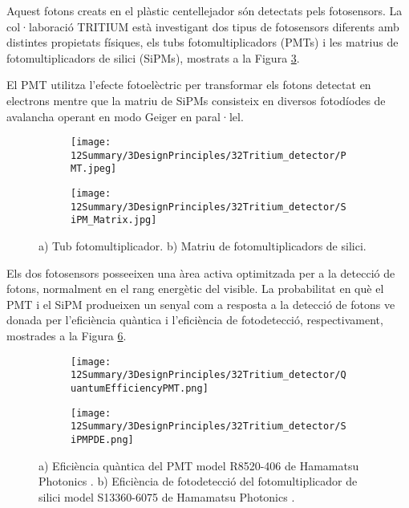 Aquest fotons creats en el plàstic centellejador són detectats pels fotosensors. La col·laboració TRITIUM està investigant dos tipus de fotosensors diferents amb distintes propietats físiques, els tubs fotomultiplicadors (PMTs) i les matrius de fotomultiplicadors de silici (SiPMs), mostrats a la Figura \ref{fig:Fotosensors}.

El PMT utilitza l'efecte fotoelèctric per transformar els fotons detectat en electrons mentre que la matriu de SiPMs consisteix en diversos fotodíodes de avalancha operant en modo Geiger en paral·lel.

\begin{figure}[htpb]
\centering
    \begin{subfigure}[b]{0.4\textwidth}
    \centering
    \texttt{[image: 12Summary/3DesignPrinciples/32Tritium\_detector/PMT.jpeg]}  
    \caption{\label{subfig:PMT}}
    \end{subfigure}
    \hfill
    \begin{subfigure}[b]{0.4\textwidth}
    \centering
    \texttt{[image: 12Summary/3DesignPrinciples/32Tritium\_detector/SiPM\_Matrix.jpg]}  
    \caption{\label{subfig:SiPM}}
    \end{subfigure}
 \caption{a) Tub fotomultiplicador. b) Matriu de fotomultiplicadors de silici.}
 \label{fig:Fotosensors}
\end{figure}

Els dos fotosensors posseeixen una àrea activa optimitzada per a la detecció de fotons, normalment en el rang energètic del visible. La probabilitat en què el PMT i el SiPM produeixen un senyal com a resposta a la detecció de fotons ve donada per l'eficiència quàntica i l'eficiència de fotodetecció, respectivament, mostrades a la Figura \ref{fig:EficienciaFotosensors}. 

\begin{figure}[htpb]
\centering
    \begin{subfigure}[b]{0.75\textwidth}
    \centering
    \texttt{[image: 12Summary/3DesignPrinciples/32Tritium\_detector/QuantumEfficiencyPMT.png]}  
    \caption{\label{subfig:QEPMT}}
    \end{subfigure}
    \hfill
    \begin{subfigure}[b]{0.75\textwidth}
    \centering
    \texttt{[image: 12Summary/3DesignPrinciples/32Tritium\_detector/SiPMPDE.png]}  
    \caption{\label{subfig:PDESiPM}}
    \end{subfigure}
 \caption{a) Eficiència quàntica del PMT model R8520-406 de Hamamatsu Photonics \cite{DataSheetPMTs}. b) Eficiència de fotodetecció del fotomultiplicador de silici model S13360-6075 de Hamamatsu Photonics \cite{DataSheetHammamatsu_1_SiPM_1375}.}
 \label{fig:EficienciaFotosensors}
\end{figure}


